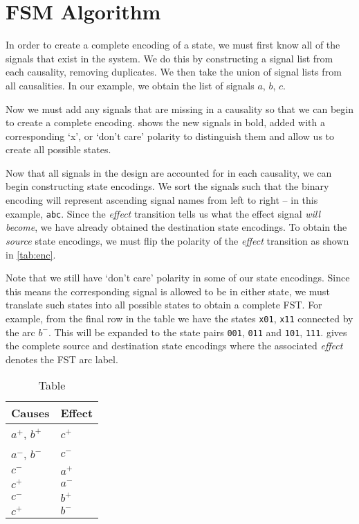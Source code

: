 \section{FSM Algorithm}\label{sec:algo}

In order to create a complete encoding of a state, we must first know all of the signals that exist in the system.
We do this by constructing a signal list from each causality, removing duplicates.
We then take the union of signal lists from all causalities.
In our example, we obtain the list of signals $a$, $b$, $c$.

Now we must add any signals that are missing in a causality so that we can begin to create a complete encoding.
 shows the new signals in bold, added with a corresponding `x', or `don't care' polarity to distinguish them and allow us to create all possible states.

Now that all signals in the design are accounted for in each causality, we can begin constructing state encodings.
We sort the signals such that the binary encoding will represent ascending signal names from left to right -- in this example, \texttt{abc}.
Since the \emph{effect} transition tells us what the effect signal \emph{will become}, we have already obtained the destination state encodings.
To obtain the \emph{source} state encodings, we must flip the polarity of the \emph{effect} transition as shown in \cref{tab:enc}.

Note that we still have `don't care' polarity in some of our state encodings.
Since this means the corresponding signal is allowed to be in either state, we must translate such states into all possible states to obtain a complete FST\@.
For example, from the final row in the table we have the states \texttt{x01}, \texttt{x11} connected by the arc $b^{-}$.
This will be expanded to the state pairs \texttt{001}, \texttt{011} and \texttt{101}, \texttt{111}.
 gives the complete source and destination state encodings where the associated \emph{effect} denotes the FST arc label.

\begin{table}[ht]
\caption{Table}\label{tab:causality}
\centering
\begin{tabular}{@{}ll@{}}
	\toprule
	Causes & Effect\\ \midrule
	$a^{+}$, $b^{+}$	& $c^{+}$ \\
	$a^{-}$, $b^{-}$ 	& $c^{-}$ \\
	$c^{-}$			& $a^{+}$ \\
	$c^{+}$			& $a^{-}$ \\
	$c^{-}$			& $b^{+}$ \\
	$c^{+}$			& $b^{-}$ \\
	\bottomrule
\end{tabular}
\end{table}

